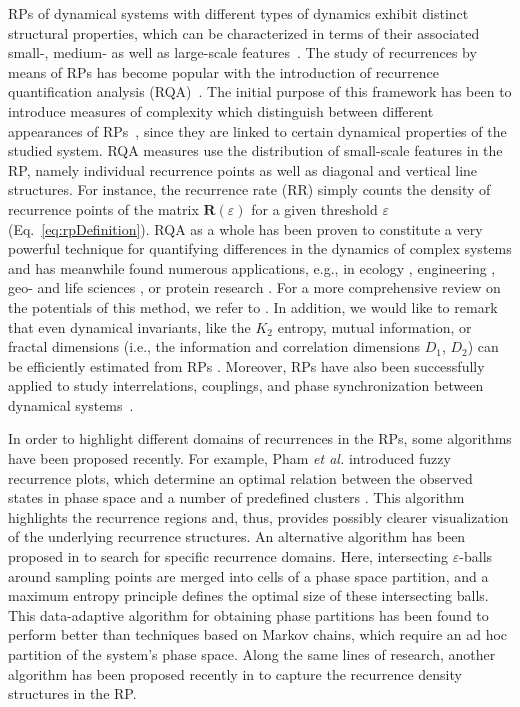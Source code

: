 RPs of dynamical systems with different types of dynamics exhibit distinct structural properties, which can be characterized in terms of their associated small-, medium- as well as large-scale features~\cite{marwan2007}. The study of recurrences by means of RPs has become popular with the introduction of recurrence quantification analysis (RQA)~\cite{zbilut92,marwan2002herz}. The initial purpose of this framework has been to introduce measures of complexity which distinguish between different appearances of RPs~\cite{marwan2008epjst}, since they are linked to certain dynamical properties of the studied system. RQA measures use the distribution of small-scale features in the RP, namely individual recurrence points as well as diagonal and vertical line structures. For instance, the recurrence rate (RR) simply counts the density of recurrence points of the matrix $\textbf{R}(\varepsilon)$ for a given threshold $\varepsilon$ (Eq.~\eqref{eq:rpDefinition}). RQA as a whole has been proven to constitute a very powerful technique for quantifying differences in the dynamics of complex systems and has meanwhile found numerous applications, e.g., in ecology \cite{facchini2007}, engineering \cite{litak2009c}, geo- and life sciences \cite{marwan2003climdyn,marwan2007pla}, or protein research \cite{Giuliani2002a,zbilut2004a}.  For a more comprehensive review on the potentials of this method, we refer to \cite{marwan2007,marwan2008epjst,webber2009}. In addition, we would like to remark that even dynamical invariants, like the $K_2$ entropy, mutual information, or fractal dimensions (i.e., the information and correlation dimensions $D_1$, $D_2$) can be efficiently estimated from RPs \cite{thiel2004a,marwan2007}. Moreover, RPs have also been successfully applied to study interrelations, couplings, and phase synchronization between dynamical systems~\cite{marwan2002,romano2004,romano2005,Romano2007,vanLeeuwen2009,Nawrath2010,marwan2013c}.

In order to highlight different domains of recurrences in the RPs, some algorithms have been proposed recently. For example, Pham {\textit{et al.}} introduced fuzzy recurrence plots, which determine an optimal relation between the observed states in phase space and a number of predefined clusters \cite{Pham2016}. This algorithm highlights the recurrence regions and, thus, provides possibly clearer visualization of the underlying recurrence structures. An alternative algorithm has been proposed in \cite{graben2013} to search for specific recurrence domains. Here, intersecting $\varepsilon$-balls around sampling points are merged into cells of a phase space partition, and a maximum entropy principle defines the optimal size of these intersecting balls. This data-adaptive algorithm for obtaining phase partitions has been found to perform better than techniques based on Markov chains, which require an ad hoc partition of the system's phase space. Along the same lines of research, another algorithm has been proposed recently in \cite{Costa2018} to capture the recurrence density structures in the RP.


